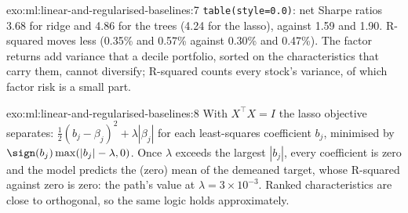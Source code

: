 \begin{solution}{exo:ml:linear-and-regularised-baselines:7}
\texttt{table(style=0.0)}: net Sharpe ratios 3.68 for ridge and 4.86 for the trees (4.24 for the lasso), against 1.59
and 1.90. R-squared moves less (0.35\% and 0.57\% against 0.30\% and 0.47\%). The factor returns add variance that a
decile portfolio, sorted on the characteristics that carry them, cannot diversify; R-squared counts every stock's
variance, of which factor risk is a small part.
\end{solution}

\begin{solution}{exo:ml:linear-and-regularised-baselines:8}
With $X^\top X = I$ the lasso objective separates: $\frac12(b_j - \beta_j)^2 + \lambda|\beta_j|$ for each least-squares
coefficient $b_j$, minimised by $\sign(b_j)\max(|b_j| - \lambda, 0)$. Once $\lambda$ exceeds the largest $|b_j|$, every
coefficient is zero and the model predicts the (zero) mean of the demeaned target, whose R-squared against zero is zero: the path's value at
$\lambda = 3\times10^{-3}$. Ranked characteristics are close to orthogonal, so the same logic holds approximately.
\end{solution}


